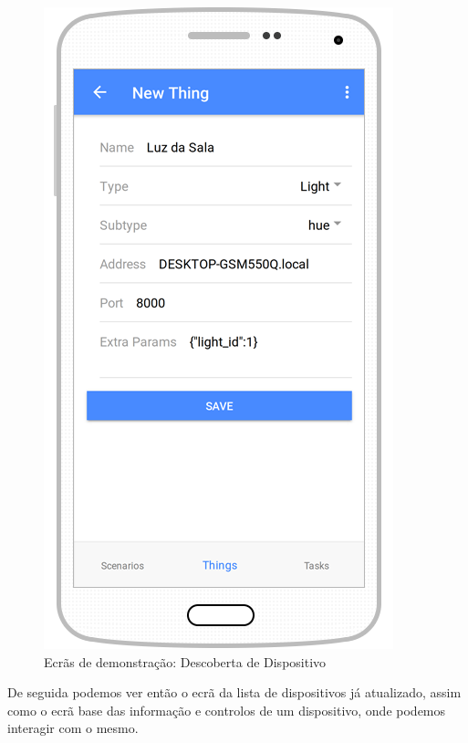 \begin{figure}[H]
  \centering
        \includegraphics[scale=0.6]{img/demo/new_things_full.png}
  \caption{Ecrãs de demonstração: Descoberta de Dispositivo}
\end{figure}

De seguida podemos ver então o ecrã da lista de dispositivos já atualizado, assim como o ecrã base das informação e controlos de um dispositivo, onde podemos interagir com o mesmo.

